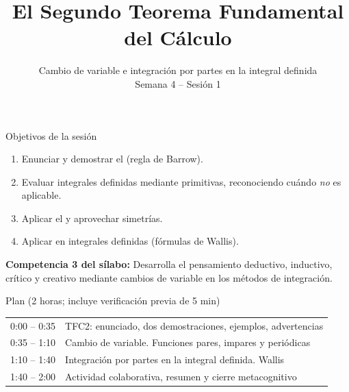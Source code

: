 \documentclass[10pt,aspectratio=169]{beamer}
\title[Segundo TFC]{El Segundo Teorema Fundamental del Cálculo}
\subtitle{Cambio de variable e integración por partes en la integral definida\\[2pt]\small Semana 4 -- Sesión 1}
\begin{document}
\begin{frame}
  \titlepage
\end{frame}

\begin{frame}{Objetivos de la sesión}
  \begin{enumerate}
    \item Enunciar y demostrar el  (regla de Barrow).
    \item Evaluar integrales definidas mediante primitivas, reconociendo cuándo \emph{no} es aplicable.
    \item Aplicar el  y aprovechar simetrías.
    \item Aplicar  en integrales definidas (fórmulas de Wallis).
  \end{enumerate}
  \vspace{1mm}
  {\small\textbf{Competencia 3 del sílabo:} Desarrolla el pensamiento deductivo, inductivo, crítico y creativo mediante cambios de variable en los métodos de integración.}
  \begin{block}{Plan (2 horas; incluye verificación previa de 5 min)}
    \begin{tabular}{ll}
      0:00 -- 0:35 & TFC2: enunciado, dos demostraciones, ejemplos, advertencias\\
      0:35 -- 1:10 & Cambio de variable. Funciones pares, impares y periódicas\\
      1:10 -- 1:40 & Integración por partes en la integral definida. Wallis\\
      1:40 -- 2:00 & Actividad colaborativa, resumen y cierre metacognitivo
    \end{tabular}
  \end{block}
\end{frame}
\end{document}
